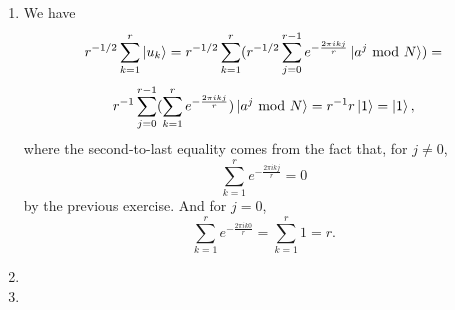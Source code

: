 \documentclass [12pt]{article}
\theoremstyle{definition}
\begin{document}
\begin{enumerate}
\item We have
\[r^{-1/2}\sum_{k=1}^r\ket{u_k} = r^{-1/2}\sum_{k=1}^r (r^{-1/2}\sum_{j=0}^{r-1}e^{-\frac{2\pi ikj}{r}}\ket{a^j\mbox{ mod } N}) = \]
\[r^{-1}\sum_{j=0}^{r-1}(\sum_{k=1}^r e^{-\frac{2\pi ikj}{r}})\ket{a^j\mbox{ mod } N} = r^{-1}r\ket{1}=\ket{1},\]
where the second-to-last equality comes from the fact that, for $j\not= 0$,
\[\sum_{k=1}^r e^{-\frac{2\pi ikj}{r}} = 0\]
by the previous exercise. And for $j=0$,
\[\sum_{k=1}^r e^{-\frac{2\pi ik0}{r}} = \sum_{k=1}^r 1 = r.\]


\item 

\item 




\end{enumerate}
\end{document}
